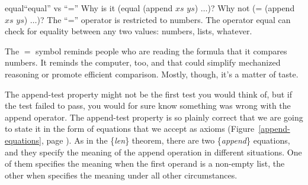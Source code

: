 \begin{aside}{equal}{``\textsf{equal}'' vs ``\textsf{=}''}
Why is it \textsf{(equal (append $xs$ $ys$) $\dots$)}?
Why not \textsf{(= (append $xs$ $ys$) $\dots$)}?
The ``\textsf{=}'' operator
is restricted to numbers. The operator \textsf{equal} can check
for equality between any two values: numbers, lists, whatever.

The $=$ symbol reminds people who are
reading the formula that it compares numbers.
It reminds the computer, too, and that could
simplify mechanized reasoning or
promote efficient comparison.
Mostly, though, it's a matter of
taste.
\end{aside}

The append-test property might not be the first test you would think of,
but if the test failed to pass,
you would for sure know something was wrong with the \textsf{append} operator.
The append-test property is so plainly correct that
we are going to state it in the form of equations that we accept as axioms
(Figure~\ref{append-equations}, page \pageref{append-equations}).
As in the \{\emph{len}\} theorem, there are two \{\emph{append}\} equations,
and they specify the meaning of the append operation in different situations.
One of them specifies the meaning when the first operand is a non-empty list,
the other when specifies the meaning under all other circumstances.

